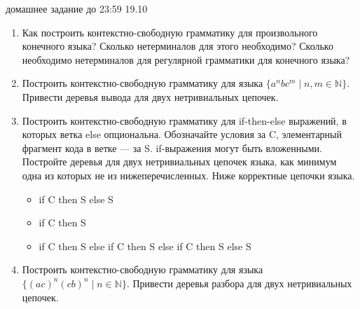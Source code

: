 \documentclass[12pt]{article}
\begin{document}

{\Large домашнее задание до 23:59 19.10}
\bigskip

\begin{enumerate}
  \item 
  {
    Как построить контекстно-свободную грамматику для произвольного конечного языка? Сколько нетерминалов для этого необходимо? Сколько необходимо нетерминалов для регулярной грамматики для конечного языка?
  }
  \item 
  {  
    Построить контекстно-свободную грамматику для языка $\{a^n b c^m \mid n, m \in \mathbb{N}\}$. Привести деревья вывода для двух нетривиальных цепочек.
  }
  \item 
  { 
    Построить контекстно-свободную грамматику для if-then-else выражений, в которых ветка else опциональна. Обозначайте условия за C, элементарный фрагмент кода в ветке --- за S. if-выражения могут быть вложенными. Постройте деревья для двух нетривиальных цепочек языка, как минимум одна из которых не из нижеперечисленных. Ниже корректные цепочки языка.
    \begin{itemize}
        \item if C then S else S 
        \item if C then S 
        \item if C then S else if C then S else if C then S else S
    \end{itemize} 
  }
  \item { Построить контекстно-свободную грамматику для языка $\{ (ac)^n (cb)^n \mid n \in \mathbb{N}\}$. Привести деревья разбора для двух нетривиальных цепочек. }
  
\end{enumerate}

\end{document}
